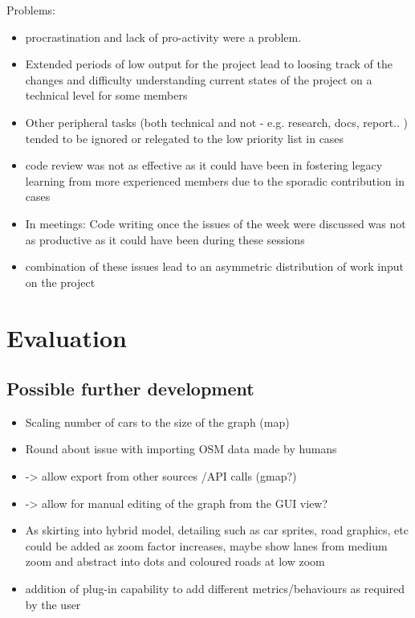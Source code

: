     Problems:
    \begin{itemize}
    	\item procrastination and lack of pro-activity were a problem.
    	\item Extended periods of low output for the project lead to loosing track of the changes and difficulty understanding current states of the project on a technical level for some members
    	\item Other peripheral tasks (both technical and not - e.g. research, docs, report.. ) tended to be ignored or relegated to the low priority list in cases
		\item code review was not as effective as it could have been in fostering legacy learning from more experienced members due to the sporadic contribution in cases
    	\item In meetings: Code writing once the issues of the week were discussed was not as productive as it could have been during these sessions
    	\item combination of these issues lead to an asymmetric distribution of work input on the project
    \end{itemize}

\section{Evaluation}
\subsection{Possible further development}
\begin{itemize}
	\item Scaling number of cars to the size of the graph  (map)
	\item Round about issue with importing OSM data made by humans 
	\item -> allow export from other sources /API calls (gmap?)
	\item -> allow for manual editing of the graph from the GUI view?
	\item As skirting into hybrid model, detailing such as car sprites, road graphics, etc could be added as zoom factor increases, maybe show lanes from medium zoom and abstract into dots and coloured roads at low zoom
	\item addition of plug-in capability to add different metrics/behaviours as required by the user
\end{itemize}


